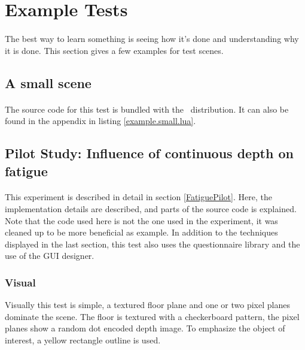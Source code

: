 \section{Example Tests}
\paragraph{}
The best way to learn something is seeing how it's done and understanding why it is done.
This section gives a few examples for test scenes.

\subsection{A small scene}
\paragraph{}
The source code for this test is bundled with the \ER\ distribution.
It can also be found in the appendix in listing \ref{example.small.lua}.


\subsection[Influence of continuous depth]{Pilot Study: Influence of continuous depth on fatigue\label{ExampleFatiguePilot}}
\paragraph{}
This experiment is described in detail in section \ref{FatiguePilot}.
Here, the implementation details are described, and parts of the source code is explained.
Note that the code used here is not the one used in the experiment, it was cleaned up to be more beneficial as example.
In addition to the techniques displayed in the last section, this test also uses the questionnaire library and the use of the GUI designer.

\subsubsection{Visual}
Visually this test is simple, a textured floor plane and one or two pixel planes dominate the scene.
The floor is textured with a checkerboard pattern, the pixel planes show a random dot encoded depth image.
To emphasize the object of interest, a yellow rectangle outline is used.

